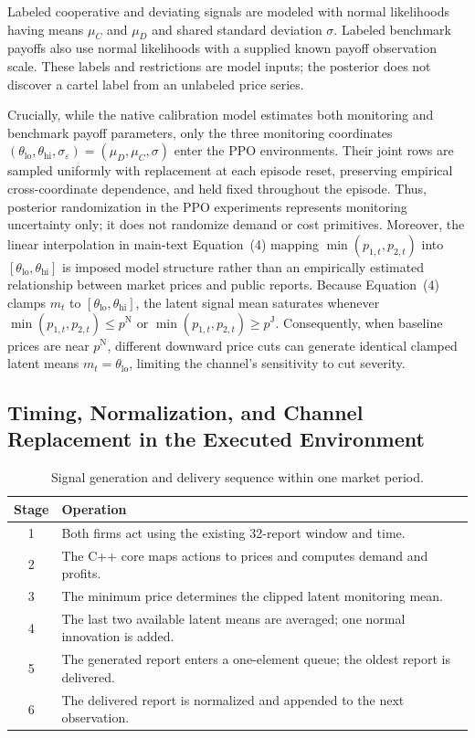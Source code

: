 \documentclass{article}
\begin{document}
Labeled cooperative and deviating signals are modeled with normal likelihoods having means $\mu_C$ and $\mu_D$ and shared standard deviation $\sigma$. Labeled benchmark payoffs also use normal likelihoods with a supplied known payoff observation scale. These labels and restrictions are model inputs; the posterior does not discover a cartel label from an unlabeled price series.

Crucially, while the native calibration model estimates both monitoring and benchmark payoff parameters, only the three monitoring coordinates $(\theta_{\mathrm{lo}}, \theta_{\mathrm{hi}}, \sigma_\varepsilon) = (\mu_D, \mu_C, \sigma)$ enter the PPO environments. Their joint rows are sampled uniformly with replacement at each episode reset, preserving empirical cross-coordinate dependence, and held fixed throughout the episode. Thus, posterior randomization in the PPO experiments represents monitoring uncertainty only; it does not randomize demand or cost primitives. Moreover, the linear interpolation in main-text Equation~(4) mapping $\min(p_{1,t},p_{2,t})$ into $[\theta_{\mathrm{lo}},\theta_{\mathrm{hi}}]$ is imposed model structure rather than an empirically estimated relationship between market prices and public reports. Because Equation~(4) clamps $m_t$ to $[\theta_{\mathrm{lo}},\theta_{\mathrm{hi}}]$, the latent signal mean saturates whenever $\min(p_{1,t},p_{2,t}) \leq p^{\mathrm{N}}$ or $\min(p_{1,t},p_{2,t}) \geq p^{\mathrm{J}}$. Consequently, when baseline prices are near $p^{\mathrm{N}}$, different downward price cuts can generate identical clamped latent means $m_t = \theta_{\mathrm{lo}}$, limiting the channel's sensitivity to cut severity.

\subsection{Timing, Normalization, and Channel Replacement in the Executed Environment}

\begin{table}[t]
\centering
\caption{Signal generation and delivery sequence within one market period.}
\label{tab:timing}
\small
\begin{tabular}{@{}cl@{}}
\toprule
Stage & Operation \\
\midrule
1 & Both firms act using the existing 32-report window and time. \\
2 & The C++ core maps actions to prices and computes demand and profits. \\
3 & The minimum price determines the clipped latent monitoring mean. \\
4 & The last two available latent means are averaged; one normal innovation is added. \\
5 & The generated report enters a one-element queue; the oldest report is delivered. \\
6 & The delivered report is normalized and appended to the next observation. \\
\bottomrule
\end{tabular}
\end{table}
\end{document}
